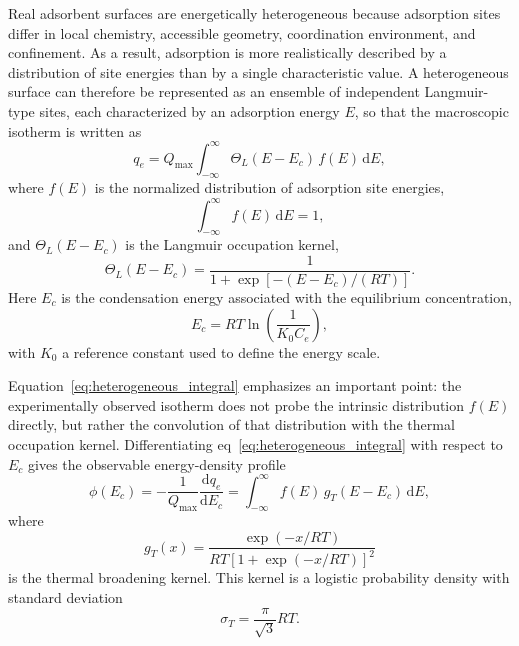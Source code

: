 \documentclass[journal=jacsat,manuscript=article]{achemso}
\begin{document}
	Real adsorbent surfaces are energetically heterogeneous because adsorption sites differ in local chemistry, accessible geometry, coordination environment, and confinement. As a result, adsorption is more realistically described by a distribution of site energies than by a single characteristic value. A heterogeneous surface can therefore be represented as an ensemble of independent Langmuir-type sites, each characterized by an adsorption energy $E$, so that the macroscopic isotherm is written as
	\begin{equation}
		q_e
		=
		Q_{\max}
		\int_{-\infty}^{\infty}
		\Theta_L(E-E_c)\, f(E)\,\mathrm{d}E,
		\label{eq:heterogeneous_integral}
	\end{equation}
	where $f(E)$ is the normalized distribution of adsorption site energies,
	\begin{equation}
		\int_{-\infty}^{\infty} f(E)\,\mathrm{d}E = 1,
	\end{equation}
	and $\Theta_L(E-E_c)$ is the Langmuir occupation kernel,
	\begin{equation}
		\Theta_L(E-E_c)
		=
		\frac{1}{1+\exp\!\left[-(E-E_c)/(RT)\right]}.
		\label{eq:langmuir_kernel_energy}
	\end{equation}
	Here $E_c$ is the condensation energy associated with the equilibrium concentration,
	\begin{equation}
		E_c = RT\ln\!\left(\frac{1}{K_0 C_e}\right),
		\label{eq:condensation_energy}
	\end{equation}
	with $K_0$ a reference constant used to define the energy scale.
	
	Equation~\eqref{eq:heterogeneous_integral} emphasizes an important point: the experimentally observed isotherm does not probe the intrinsic distribution $f(E)$ directly, but rather the convolution of that distribution with the thermal occupation kernel. Differentiating eq~\eqref{eq:heterogeneous_integral} with respect to $E_c$ gives the observable energy-density profile
	\begin{equation}
		\phi(E_c)
		=
		-\frac{1}{Q_{\max}}\frac{\mathrm{d}q_e}{\mathrm{d}E_c}
		=
		\int_{-\infty}^{\infty}
		f(E)\, g_T(E-E_c)\,\mathrm{d}E,
		\label{eq:observable_distribution}
	\end{equation}
	where
	\begin{equation}
		g_T(x)
		=
		\frac{\exp(-x/RT)}
		{RT\left[1+\exp(-x/RT)\right]^2}
		\label{eq:thermal_kernel}
	\end{equation}
	is the thermal broadening kernel. This kernel is a logistic probability density with standard deviation
	\begin{equation}
		\sigma_T = \frac{\pi}{\sqrt{3}}RT.
		\label{eq:thermal_sigma}
	\end{equation}
	
\end{document}
